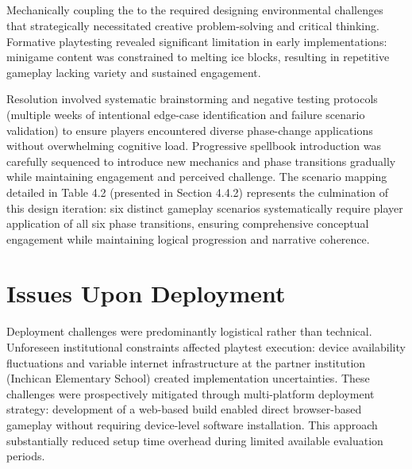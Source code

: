 \subsection{\texorpdfstring{}{Coupling of Platformer and Particle Lattice Minigame Systems}}

Mechanically coupling the  to the  required designing environmental challenges that strategically necessitated creative problem-solving and critical thinking. Formative playtesting revealed significant limitation in early implementations: minigame content was constrained to melting ice blocks, resulting in repetitive gameplay lacking variety and sustained engagement.

Resolution involved systematic brainstorming and negative testing protocols (multiple weeks of intentional edge-case identification and failure scenario validation) to ensure players encountered diverse phase-change applications without overwhelming cognitive load. Progressive spellbook introduction was carefully sequenced to introduce new mechanics and phase transitions gradually while maintaining engagement and perceived challenge. The scenario mapping detailed in Table 4.2 (presented in Section 4.4.2) represents the culmination of this design iteration: six distinct gameplay scenarios systematically require player application of all six phase transitions, ensuring comprehensive conceptual engagement while maintaining logical progression and narrative coherence.

\section{Issues Upon Deployment}

Deployment challenges were predominantly logistical rather than technical. Unforeseen institutional constraints affected playtest execution: device availability fluctuations and variable internet infrastructure at the partner institution (Inchican Elementary School) created implementation uncertainties. These challenges were prospectively mitigated through multi-platform deployment strategy: development of a web-based build enabled direct browser-based gameplay without requiring device-level software installation. This approach substantially reduced setup time overhead during limited available evaluation periods.

